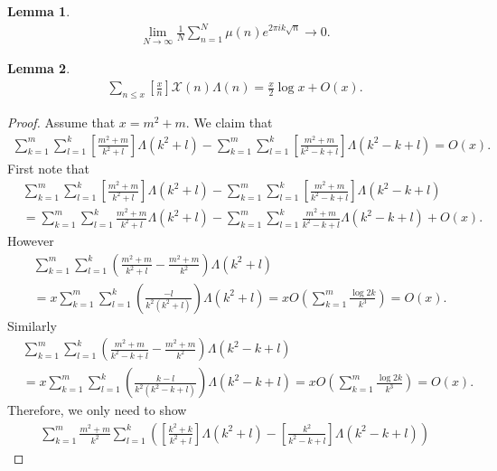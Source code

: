 \documentclass[a4paper,10pt]{amsart}
\newtheorem{lemma}{Lemma}[section]
\newcommand{\X}{\mathcal X}
\begin{document}
\begin{lemma}
   \begin{align*}
       \lim_{N \rightarrow \infty}
       \frac{1}{N}\sum_{n=1}^{N} \mu(n) e^{2\pi ik\sqrt{n}}
       \rightarrow 0.
   \end{align*} 
\end{lemma}

\begin{lemma}
   \begin{align*}
       \sum_{n \leq x}\left[\frac{x}{n} \right]\X(n)\Lambda(n) 
       = \frac{x}{2}\log x + O(x). 
   \end{align*} 
\end{lemma}

\begin{proof}
    Assume that $x = m^2+m$. We claim that 
    \begin{align*}
        \sum_{k=1}^{m} \sum_{l=1}^{k}\left[\frac{m^2+m}{k^2+l} 
        \right]\Lambda(k^2+l) 
        - \sum_{k=1}^{m} \sum_{l=1}^{k}\left[\frac{m^2+m}{k^2-k+l} \right]
        \Lambda(k^2-k+l) = O(x).
    \end{align*} 
    First note that
    \begin{align*}
        &\sum_{k=1}^{m} \sum_{l=1}^{k}\left[\frac{m^2+m}{k^2+l} 
        \right]\Lambda(k^2+l) 
        - \sum_{k=1}^{m} \sum_{l=1}^{k}\left[\frac{m^2+m}{k^2-k+l} \right]
        \Lambda(k^2-k+l) \\
        &=
        \sum_{k=1}^{m} \sum_{l=1}^{k}\frac{m^2+m}{k^2+l} 
        \Lambda(k^2+l) 
        - \sum_{k=1}^{m} \sum_{l=1}^{k}\frac{m^2+m}{k^2-k+l}
        \Lambda(k^2-k+l) + O(x).
    \end{align*}
    However
    \begin{align*}
        &\sum_{k=1}^{m} \sum_{l=1}^{k}(\frac{m^2+m}{k^2+l} - \frac{m^2+m}{k^2}) 
        \Lambda(k^2+l)\\
        &=x\sum_{k=1}^{m} \sum_{l=1}^{k}(\frac{-l}{k^2(k^2+l)})
        \Lambda(k^2+l)
        = xO(\sum_{k=1}^{m}\frac{\log 2k}{k^3}) = O(x). 
    \end{align*}
    Similarly
    \begin{align*}
        &\sum_{k=1}^{m} \sum_{l=1}^{k}(\frac{m^2+m}{k^2 -k +l} - \frac{m^2+m}{k^2}) 
        \Lambda(k^2-k+l)\\
        &=x\sum_{k=1}^{m} \sum_{l=1}^{k}(\frac{k-l}{k^2(k^2-k+l)})
        \Lambda(k^2-k+l)
        = xO(\sum_{k=1}^{m}\frac{\log 2k}{k^3}) = O(x). 
    \end{align*}
    Therefore, we only need to show
    \begin{align*}
        \sum_{k=1}^{m} \frac{m^2+m}{k^2}\sum_{l=1}^{k}\left (
        \left[\frac{k^2+k}{k^2+l}\right]\Lambda(k^2+l) -
    \left[\frac{k^2}{k^2-k+l}\right]\Lambda(k^2-k+l) \right)
    \end{align*}
\end{proof}
\end{document}

